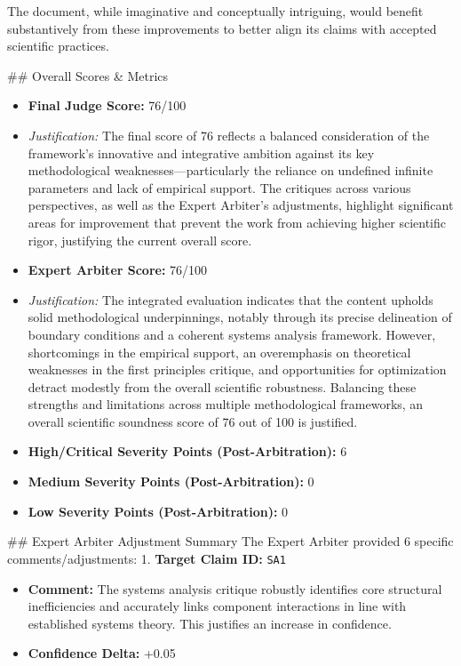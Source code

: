 \documentclass[12pt]{article}
\begin{document}
The document, while imaginative and conceptually intriguing, would benefit substantively from these improvements to better align its claims with accepted scientific practices.

\hrulefill
\#\# Overall Scores \& Metrics
\begin{itemize}
  \item \textbf{Final Judge Score:} 76/100
  \item \textit{Justification:} The final score of 76 reflects a balanced consideration of the framework’s innovative and integrative ambition against its key methodological weaknesses—particularly the reliance on undefined infinite parameters and lack of empirical support. The critiques across various perspectives, as well as the Expert Arbiter's adjustments, highlight significant areas for improvement that prevent the work from achieving higher scientific rigor, justifying the current overall score.
  \item \textbf{Expert Arbiter Score:} 76/100
  \item \textit{Justification:} The integrated evaluation indicates that the content upholds solid methodological underpinnings, notably through its precise delineation of boundary conditions and a coherent systems analysis framework. However, shortcomings in the empirical support, an overemphasis on theoretical weaknesses in the first principles critique, and opportunities for optimization detract modestly from the overall scientific robustness. Balancing these strengths and limitations across multiple methodological frameworks, an overall scientific soundness score of 76 out of 100 is justified.
  \item \textbf{High/Critical Severity Points (Post-Arbitration):} 6
  \item \textbf{Medium Severity Points (Post-Arbitration):} 0
  \item \textbf{Low Severity Points (Post-Arbitration):} 0
\end{itemize}
\hrulefill
\#\# Expert Arbiter Adjustment Summary
The Expert Arbiter provided 6 specific comments/adjustments:
1. \textbf{Target Claim ID:} \texttt{SA1}
\begin{itemize}
  \item \textbf{Comment:} The systems analysis critique robustly identifies core structural inefficiencies and accurately links component interactions in line with established systems theory. This justifies an increase in confidence.
  \item \textbf{Confidence Delta:} +0.05
\end{itemize}
\end{document}
